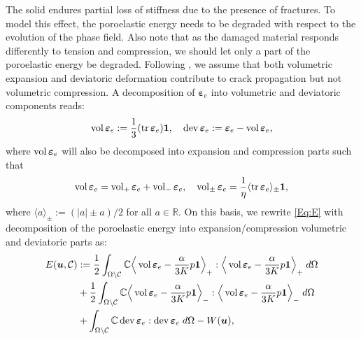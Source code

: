 The solid endures partial loss of stiffness due to the presence of fractures. To model this effect, the poroelastic energy needs to be degraded with respect to the evolution of the phase field. Also note that as the damaged material responds differently to tension and compression, we should let only a part of the poroelastic energy be degraded. Following \cite{amor2009regularized}, we assume that both volumetric expansion and deviatoric deformation contribute to crack propagation but not volumetric compression. 
A decomposition of $\bm{\varepsilon}_e$ into volumetric and deviatoric components reads:
\begin{equation}
	\begin{aligned}
		\operatorname{vol}\bm{\varepsilon}_e := \frac{1}{3} (\operatorname{tr}\bm{\varepsilon}_e) \mathbf{1}, \quad
		\operatorname{dev}\bm{\varepsilon}_e := \bm{\varepsilon}_e - \operatorname{vol}\bm{\varepsilon}_e,
	\end{aligned}
\end{equation}
where $\operatorname{vol}\bm{\varepsilon}_e$ will also be decomposed into expansion and compression parts such that
\begin{equation}
	\begin{aligned}
		\operatorname{vol}\bm{\varepsilon}_e=\operatorname{vol}_+\bm{\varepsilon}_e+\operatorname{vol}_-\bm{\varepsilon}_e, \quad \operatorname{vol}_{\pm}\bm{\varepsilon}_e=\frac{1}{\eta}\langle \operatorname{tr} \bm{\varepsilon}_e \rangle_{\pm}\mathbf{1},
	\end{aligned}
\end{equation}
where $\langle a\rangle_\pm:=\left(|a|\pm a\right)/2$ for all $a\in\mathbb{R}$.
On this basis, we rewrite \eqref{Eq:E} with decomposition of the poroelastic energy into expansion/compression volumetric and deviatoric parts as:
\begin{equation*}\label{Eq:E_Amor}
	\begin{aligned}
		E(\bm{u},\mathcal{C})&:= \frac12 \int_{\Omega\setminus\mathcal{C}} \mathbb{C}\Big\langle\operatorname{vol}\bm{\varepsilon}_e-\frac{\alpha}{3K}p\mathbf{1}\Big\rangle_{+}:\Big\langle\operatorname{vol}\bm{\varepsilon}_e-\frac{\alpha}{3K}p\mathbf{1}\Big\rangle_{+}\; d\Omega \\&+
		\frac12 \int_{\Omega\setminus\mathcal{C}} \mathbb{C}\Big\langle\operatorname{vol}\bm{\varepsilon}_e-\frac{\alpha}{3K}p\mathbf{1}\Big\rangle_{-}:\Big\langle\operatorname{vol}\bm{\varepsilon}_e-\frac{\alpha}{3K}p\mathbf{1}\Big\rangle_{-}\; d\Omega \\&+ \int_{\Omega\setminus\mathcal{C}} \mathbb{C}\operatorname{dev}\bm{\varepsilon}_e:\operatorname{dev}\bm{\varepsilon}_e\; d\Omega - W(\bm{u}),
	\end{aligned}
\end{equation*}
